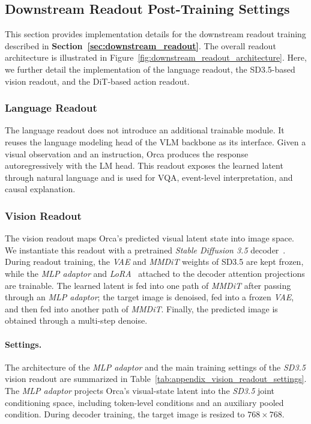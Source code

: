 \documentclass{llmxive}
\begin{document}
\subsection{Downstream Readout Post-Training Settings}
\label{sec:appendix_downstream_readout_settings}

This section provides implementation details for the downstream readout training described in \textbf{Section~\ref{sec:downstream_readout}}. The overall readout architecture is illustrated in Figure~\ref{fig:downstream_readout_architecture}. Here, we further detail the implementation of the language readout, the SD3.5-based vision readout, and the DiT-based action readout.

\subsubsection{Language Readout}
\label{sec:appendix_language_readout}


The language readout does not introduce an additional trainable module.
It reuses the language modeling head of the VLM backbone as its interface. Given a visual observation and an instruction, Orca produces the response autoregressively with the LM head. This readout exposes the learned latent through natural language and is used for VQA, event-level interpretation, and causal explanation.



\subsubsection{Vision Readout}
\label{sec:appendix_vision_readout}

The vision readout maps Orca's predicted visual latent state into image space. We instantiate this readout with a pretrained \textit{Stable Diffusion 3.5} decoder~\citep{sd35}. During readout training, the \textit{VAE} and \textit{MMDiT} weights of SD3.5 are kept frozen, while the \textit{MLP adaptor} and \textit{LoRA}~\citep{lora} attached to the decoder attention projections are trainable. The learned latent is fed into one path of \textit{MMDiT} after passing through an \textit{MLP adaptor}; the target image is denoised, fed into a frozen \textit{VAE}, and then fed into another path of \textit{MMDiT}. Finally, the predicted image is obtained through a multi-step denoise.




\paragraph{Settings.}
The architecture of the \textit{MLP adaptor} and the main training settings of the \textit{SD3.5} vision readout are summarized in Table~\ref{tab:appendix_vision_readout_settings}. The \textit{MLP adaptor} projects Orca's visual-state latent into the \textit{SD3.5} joint conditioning space, including token-level conditions and an auxiliary pooled condition. During decoder training, the target image is resized to \(768\times768\).
\end{document}
